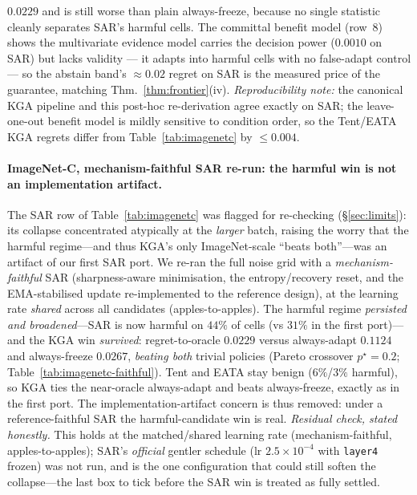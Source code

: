 \documentclass[conference]{IEEEtran}
\theoremstyle{plain}
\theoremstyle{definition}
\begin{document}
\begin{table}[t]
{$0.0229$ and is still worse than plain always-freeze, because no single statistic
cleanly separates SAR's harmful cells. The committal benefit model (row~8) shows the
multivariate evidence model carries the decision power ($0.0010$ on SAR) but lacks
validity --- it adapts into harmful cells with no false-adapt control --- so the
abstain band's $\approx0.02$ regret on SAR is the measured price of the guarantee,
matching Thm.~\ref{thm:frontier}(iv). \emph{Reproducibility note:} the canonical KGA
pipeline and this post-hoc re-derivation agree exactly on SAR; the leave-one-out
benefit model is mildly sensitive to condition order, so the Tent/EATA \textsc{KGA}
regrets differ from Table~\ref{tab:imagenetc} by $\le0.004$.}
\label{tab:decision-baselines}
\end{table}


\paragraph{ImageNet-C, mechanism-faithful SAR re-run: the harmful win is not an implementation artifact.}
The SAR row of Table~\ref{tab:imagenetc} was flagged for re-checking (\S\ref{sec:limits}): its
collapse concentrated atypically at the \emph{larger} batch, raising the worry that the harmful
regime---and thus \textsc{KGA}'s only ImageNet-scale ``beats both''---was an artifact of our first
SAR port. We re-ran the full noise grid with a \emph{mechanism-faithful} SAR (sharpness-aware
minimisation, the entropy/recovery reset, and the EMA-stabilised update re-implemented to the
reference design), at the learning rate \emph{shared} across all candidates (apples-to-apples).
The harmful regime \emph{persisted and broadened}---SAR is now harmful on $44\%$ of cells (vs
$31\%$ in the first port)---and the \textsc{KGA} win \emph{survived}: regret-to-oracle $0.0229$
versus always-adapt $0.1124$ and always-freeze $0.0267$, \emph{beating both} trivial policies
(Pareto crossover $p^\star{=}0.2$; Table~\ref{tab:imagenetc-faithful}). Tent and EATA stay benign
($6\%$/$3\%$ harmful), so \textsc{KGA} ties the near-oracle always-adapt and beats always-freeze,
exactly as in the first port. The implementation-artifact concern is thus removed: under a
reference-faithful SAR the harmful-candidate win is real. \emph{Residual check, stated honestly.}
This holds at the matched/shared learning rate (mechanism-faithful, apples-to-apples); SAR's
\emph{official} gentler schedule (lr $2.5{\times}10^{-4}$ with \texttt{layer4} frozen) was not run,
and is the one configuration that could still soften the collapse---the last box to tick before the
SAR win is treated as fully settled.
\end{document}
